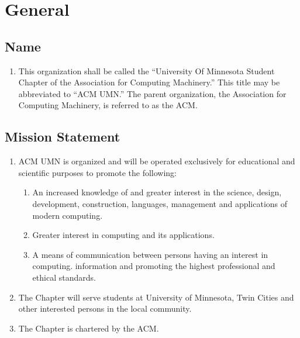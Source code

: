 




\maketitle

\section{General}

\subsection{Name}
\begin{enumerate}
	\item This organization shall be called the ``University Of Minnesota Student Chapter of the Association for Computing Machinery.'' This title may be abbreviated to ``ACM UMN.'' The parent organization, the Association for Computing Machinery, is referred to as the ACM.
\end{enumerate}

\subsection{Mission Statement}
\begin{enumerate}
	\item ACM UMN is organized and will be operated exclusively for educational and scientific purposes to promote the following:
		\begin{enumerate}
			\item An increased knowledge of and greater interest in the science, design, development, construction, languages, management and applications of modern computing.
			\item Greater interest in computing and its applications.
			\item A means of communication between persons having an interest in computing. information and promoting the highest professional and ethical standards.
		\end{enumerate}
	\item The Chapter will serve students at University of Minnesota, Twin Cities and other interested persons in the local community.
	\item The Chapter is chartered by the ACM.
\end{enumerate}


